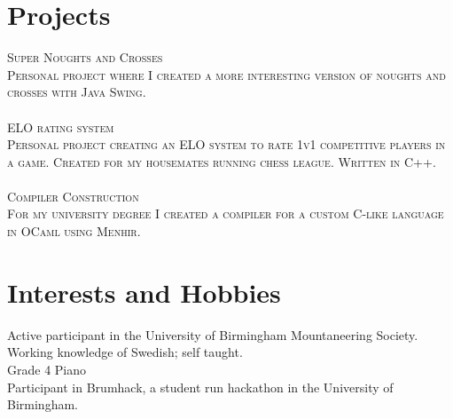 \documentclass[a4paper, 10pt]{article}
\begin{document}
\section{Projects}
 \textsc{Super Noughts and Crosses}\\
 \footnotesize\textsc{Personal project where I created a more interesting version of noughts and crosses with Java Swing.}\\\\
 \normalsize\textsc{ELO rating system}\\
 \footnotesize\textsc{Personal project creating an ELO system to rate 1v1 competitive players in a game. Created for my housemates running chess league. Written in C++.}\\\\
 \normalsize\textsc{Compiler Construction}\\
 \footnotesize\textsc{For my university degree I created a compiler for a custom C-like language in OCaml using Menhir.}
 
\normalsize
\section{Interests and Hobbies}
 Active participant in the University of Birmingham Mountaneering Society.\\
 Working knowledge of Swedish; self taught.\\
 Grade 4 Piano\\
 Participant in Brumhack, a student run hackathon in the University of Birmingham.\\
\end{document}
